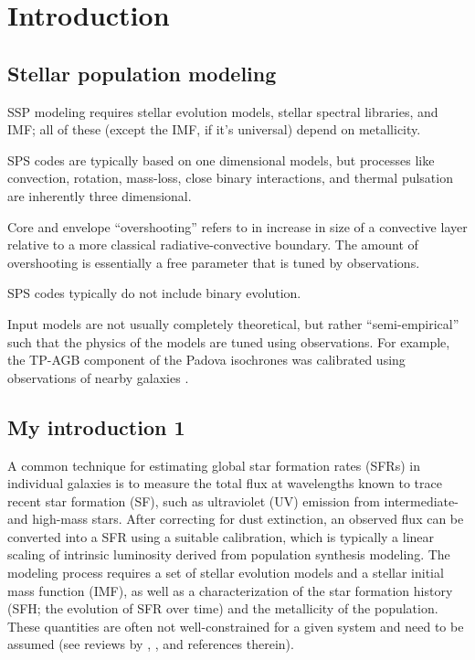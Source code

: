 \chapter{Introduction}
\label{introduction}

\section{Stellar population modeling}

SSP modeling requires stellar evolution models, stellar spectral libraries, and
IMF; all of these (except the IMF, if it's universal) depend on metallicity.

SPS codes are typically based on one dimensional models, but processes like
convection, rotation, mass-loss, close binary interactions, and thermal
pulsation are inherently three dimensional.

Core and envelope ``overshooting'' refers to in increase in size of a
convective layer relative to a more classical radiative-convective boundary.
The amount of overshooting is essentially a free parameter that is tuned by
observations.

SPS codes typically do not include binary evolution.

Input models are not usually completely theoretical, but rather
``semi-empirical'' such that the physics of the models are tuned using
observations. For example, the TP-AGB component of the Padova isochrones
\citep{Marigo:2008} was calibrated using observations of nearby galaxies
\citep{Girardi:2010}.




\section{My introduction 1}

A common technique for estimating global star formation rates (SFRs) in
individual galaxies is to measure the total flux at wavelengths known to trace
recent star formation (SF), such as ultraviolet (UV) emission from
intermediate- and high-mass stars. After correcting for dust extinction, an
observed flux can be converted into a SFR using a suitable calibration, which
is typically a linear scaling of intrinsic luminosity derived from population
synthesis modeling. The modeling process requires a set of stellar evolution
models and a stellar initial mass function (IMF), as well as a characterization
of the star formation history (SFH; the evolution of SFR over time) and the
metallicity of the population. These quantities are often not well-constrained
for a given system and need to be assumed (see reviews by
\citealt{Kennicutt:1998}, \citealt{Kennicutt:2012}, and references therein).

